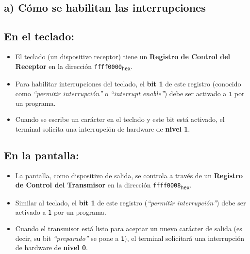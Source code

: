 \documentclass{article}
\begin{document}
\subsection*{a) Cómo se habilitan las interrupciones}

\subsection*{En el teclado:}
\begin{itemize}
    \item El teclado (un dispositivo receptor) tiene un \textbf{Registro de Control del Receptor} en la dirección \texttt{ffff0000\textsubscript{hex}}.
    \item Para habilitar interrupciones del teclado, el \textbf{bit 1} de este registro (conocido como \textit{``permitir interrupción''} o \textit{``interrupt enable''}) debe ser activado a \texttt{1} por un programa.
    \item Cuando se escribe un carácter en el teclado y este bit está activado, el terminal solicita una interrupción de hardware de \textbf{nivel 1}.
\end{itemize}

\subsection*{En la pantalla:}
\begin{itemize}
    \item La pantalla, como dispositivo de salida, se controla a través de un \textbf{Registro de Control del Transmisor} en la dirección \texttt{ffff0008\textsubscript{hex}}.
    \item Similar al teclado, el \textbf{bit 1} de este registro (\textit{``permitir interrupción''}) debe ser activado a \texttt{1} por un programa.
    \item Cuando el transmisor está listo para aceptar un nuevo carácter de salida (es decir, su bit \textit{``preparado''} se pone a \texttt{1}), el terminal solicitará una interrupción de hardware de \textbf{nivel 0}.
\end{itemize}
\end{document}
